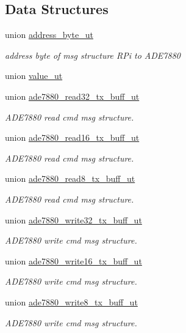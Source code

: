 \subsection*{Data Structures}
\begin{DoxyCompactItemize}
\item 
union \hyperlink{a00011}{address\-\_\-byte\-\_\-ut}
\begin{DoxyCompactList}\small\item\em address byte of msg structure R\-Pi to A\-D\-E7880 \end{DoxyCompactList}\item 
union \hyperlink{a00034}{value\-\_\-ut}
\item 
union \hyperlink{a00014}{ade7880\-\_\-read32\-\_\-tx\-\_\-buff\-\_\-ut}
\begin{DoxyCompactList}\small\item\em A\-D\-E7880 read cmd msg structure. \end{DoxyCompactList}\item 
union \hyperlink{a00013}{ade7880\-\_\-read16\-\_\-tx\-\_\-buff\-\_\-ut}
\begin{DoxyCompactList}\small\item\em A\-D\-E7880 read cmd msg structure. \end{DoxyCompactList}\item 
union \hyperlink{a00015}{ade7880\-\_\-read8\-\_\-tx\-\_\-buff\-\_\-ut}
\begin{DoxyCompactList}\small\item\em A\-D\-E7880 read cmd msg structure. \end{DoxyCompactList}\item 
union \hyperlink{a00018}{ade7880\-\_\-write32\-\_\-tx\-\_\-buff\-\_\-ut}
\begin{DoxyCompactList}\small\item\em A\-D\-E7880 write cmd msg structure. \end{DoxyCompactList}\item 
union \hyperlink{a00017}{ade7880\-\_\-write16\-\_\-tx\-\_\-buff\-\_\-ut}
\begin{DoxyCompactList}\small\item\em A\-D\-E7880 write cmd msg structure. \end{DoxyCompactList}\item 
union \hyperlink{a00019}{ade7880\-\_\-write8\-\_\-tx\-\_\-buff\-\_\-ut}
\begin{DoxyCompactList}\small\item\em A\-D\-E7880 write cmd msg structure. \end{DoxyCompactList}\item 

\end{DoxyCompactItemize}
